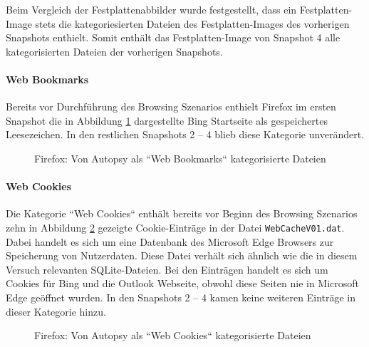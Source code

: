 \begin{appendices}
Beim Vergleich der Festplattenabbilder wurde festgestellt, dass ein Festplatten-Image stets die kategoriesierten Dateien des Festplatten-Images des vorherigen Snapshots enthielt. Somit enthält das Festplatten-Image von Snapshot 4 alle kategorisierten Dateien der vorherigen Snapshots.

\paragraph*{Web Bookmarks}
Bereits vor Durchführung des Browsing Szenarios enthielt Firefox im ersten Snapshot die in Abbildung \ref{img:firefox-web-bookmarks} dargestellte Bing Startseite als gespeichertes Leesezeichen. In den restlichen Snapshots 2 -- 4 blieb diese Kategorie unverändert.
\begin{figure}[h!]
	\centerline{}
	\caption{Firefox: Von Autopsy als ``Web Bookmarks`` kategorisierte Dateien}
	\label{img:firefox-web-bookmarks}  
\end{figure}

\paragraph*{Web Cookies}
Die Kategorie ``Web Cookies`` enthält bereits vor Beginn des Browsing Szenarios zehn in Abbildung \ref{img:firefox-web-cookies} gezeigte Cookie-Einträge in der Datei \texttt{WebCacheV01.dat}. Dabei handelt es sich um eine Datenbank des Microsoft Edge Browsers zur Speicherung von Nutzerdaten. Diese Datei verhält sich ähnlich wie die in diesem Versuch relevanten SQLite-Dateien. Bei den Einträgen handelt es sich um Cookies für Bing und die Outlook Webseite, obwohl diese Seiten nie in Microsoft Edge geöffnet wurden. In den Snapshots 2 -- 4 kamen keine weiteren Einträge in dieser Kategorie hinzu.
\begin{figure}[h!]
	\centerline{}
	\caption{Firefox: Von Autopsy als ``Web Cookies`` kategorisierte Dateien}
	\label{img:firefox-web-cookies}  
\end{figure}


\end{appendices}
